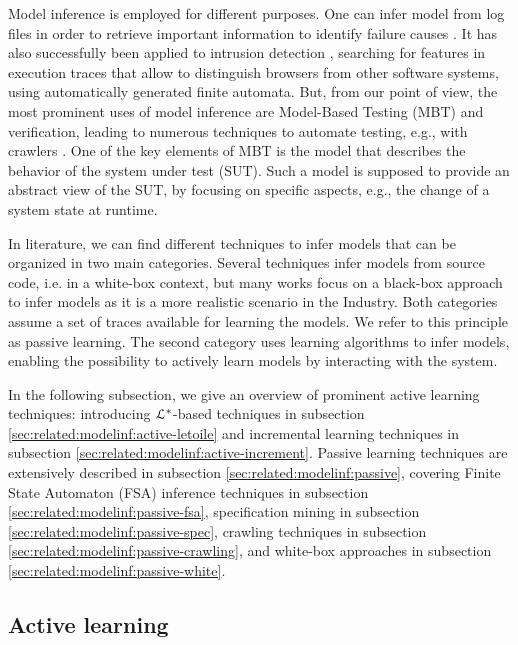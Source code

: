 Model inference is employed for different purposes. One can infer
model from log files in order to retrieve important information
to identify failure causes \cite{4700316}. It has also
successfully been applied to intrusion detection \cite{debar00},
searching for features in execution traces that allow to
distinguish browsers from other software systems, using
automatically generated finite automata.
But, from our point of view, the most prominent uses of model
inference are Model-Based Testing (MBT) and verification, leading
to numerous techniques to automate testing, e.g., with crawlers
\cite{Amalfitano:2012:UGR:2351676.2351717,Joorabchi:2012:REI:2420240.2420457,MobiGUITARIEEESoftware2014}.
One of the key elements of MBT is the model that describes the
behavior of the system under test (SUT). Such a model is supposed
to provide an abstract view of the SUT, by focusing on specific
aspects, e.g., the change of a system state at runtime.

In literature, we can find different techniques to infer models
that can be organized in two main categories. Several techniques
infer models from source code, i.e. in a white-box context, but
many works focus on a black-box approach to infer models as it is
a more realistic scenario in the Industry. Both categories assume
a set of traces available for learning the models. We refer to
this principle as passive learning. The second category uses
learning algorithms to infer models, enabling the possibility to
actively learn models by interacting with the system.

In the following subsection, we give an overview of prominent active learning
techniques: introducing $\EuScript{L}^*$-based techniques in subsection
\ref{sec:related:modelinf:active-letoile} and incremental learning techniques
in subsection \ref{sec:related:modelinf:active-increment}. Passive learning
techniques are extensively described in subsection
\ref{sec:related:modelinf:passive}, covering Finite State Automaton (FSA)
inference techniques in subsection \ref{sec:related:modelinf:passive-fsa},
specification mining in subsection \ref{sec:related:modelinf:passive-spec},
crawling techniques in subsection \ref{sec:related:modelinf:passive-crawling}, and
white-box approaches in subsection \ref{sec:related:modelinf:passive-white}.


\subsection{Active learning}
\label{sec:related:modelinf:active}

